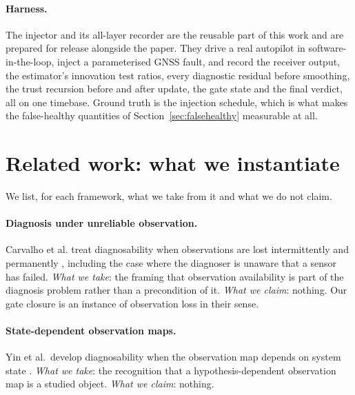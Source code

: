 \documentclass[11pt,a4paper]{article}
\begin{document}
\paragraph{Harness.} The injector and its all-layer recorder are the reusable
part of this work and are prepared for release alongside the paper. They drive
a real autopilot in software-in-the-loop, inject a parameterised GNSS fault,
and record the receiver output, the estimator's innovation test ratios, every
diagnostic residual before smoothing, the trust recursion before and after
update, the gate state and the final verdict, all on one timebase. Ground
truth is the injection schedule, which is what makes the false-healthy
quantities of Section~\ref{sec:falsehealthy} measurable at all.

\section{Related work: what we instantiate}
\label{sec:related}

We list, for each framework, what we take from it and what we do not claim.

\paragraph{Diagnosis under unreliable observation.}
Carvalho et al. treat diagnosability when observations are lost intermittently
\cite{carvalho2012intermittent} and permanently
\cite{carvalho2013permanent}, including the case where the diagnoser is
unaware that a sensor has failed. \emph{What we take}: the framing that
observation availability is part of the diagnosis problem rather than a
precondition of it. \emph{What we claim}: nothing. Our gate closure is an
instance of observation loss in their sense.

\paragraph{State-dependent observation maps.}
Yin et al.\ develop diagnosability when the observation map depends on system
state \cite{yin_phidiagnosability}. \emph{What we take}: the recognition that
a hypothesis-dependent observation map is a studied object.
\emph{What we claim}: nothing.
\end{document}
